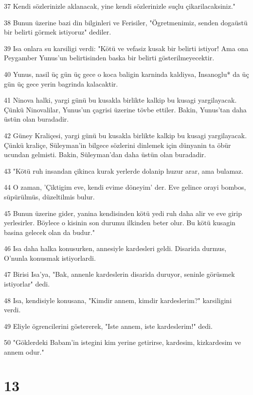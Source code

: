 \par 37 Kendi sözlerinizle aklanacak, yine kendi sözlerinizle suçlu çikarilacaksiniz."
\par 38 Bunun üzerine bazi din bilginleri ve Ferisiler, "Ögretmenimiz, senden dogaüstü bir belirti görmek istiyoruz" dediler.
\par 39 Isa onlara su karsiligi verdi: "Kötü ve vefasiz kusak bir belirti istiyor! Ama ona Peygamber Yunus'un belirtisinden baska bir belirti gösterilmeyecektir.
\par 40 Yunus, nasil üç gün üç gece o koca baligin karninda kaldiysa, Insanoglu* da üç gün üç gece yerin bagrinda kalacaktir.
\par 41 Ninova halki, yargi günü bu kusakla birlikte kalkip bu kusagi yargilayacak. Çünkü Ninovalilar, Yunus'un çagrisi üzerine tövbe ettiler. Bakin, Yunus'tan daha üstün olan buradadir.
\par 42 Güney Kraliçesi, yargi günü bu kusakla birlikte kalkip bu kusagi yargilayacak. Çünkü kraliçe, Süleyman'in bilgece sözlerini dinlemek için dünyanin ta öbür ucundan gelmisti. Bakin, Süleyman'dan daha üstün olan buradadir.
\par 43 "Kötü ruh insandan çikinca kurak yerlerde dolanip huzur arar, ama bulamaz.
\par 44 O zaman, 'Çiktigim eve, kendi evime döneyim' der. Eve gelince orayi bombos, süpürülmüs, düzeltilmis bulur.
\par 45 Bunun üzerine gider, yanina kendisinden kötü yedi ruh daha alir ve eve girip yerlesirler. Böylece o kisinin son durumu ilkinden beter olur. Bu kötü kusagin basina gelecek olan da budur."
\par 46 Isa daha halka konusurken, annesiyle kardesleri geldi. Disarida durmus, O'nunla konusmak istiyorlardi.
\par 47 Birisi Isa'ya, "Bak, annenle kardeslerin disarida duruyor, seninle görüsmek istiyorlar" dedi.
\par 48 Isa, kendisiyle konusana, "Kimdir annem, kimdir kardeslerim?" karsiligini verdi.
\par 49 Eliyle ögrencilerini göstererek, "Iste annem, iste kardeslerim!" dedi.
\par 50 "Göklerdeki Babam'in istegini kim yerine getirirse, kardesim, kizkardesim ve annem odur."

\chapter{13}

